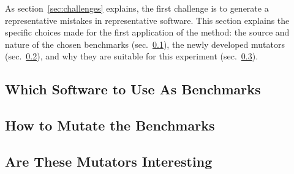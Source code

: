 
As section~\ref{sec:challenges} explains, the first challenge is to
generate a representative mistakes in representative software. This
section explains the specific choices made for the first application
of the method: the source and nature of the chosen benchmarks
(sec.~\ref{sub:mutate-benchmarks}), the newly developed mutators
(sec.~\ref{sub:mutate-mutators}), and why they are suitable for this
experiment (sec.~\ref{sub:mutate-interesting}). 

\def\sub#1#2{\subsection{#2} \label{sub:mutate-#1} }


\sub{benchmarks} {Which Software to Use As Benchmarks}
\sub{mutators}   {How to Mutate the Benchmarks} 

\sub{interesting}{Are These Mutators Interesting} 
